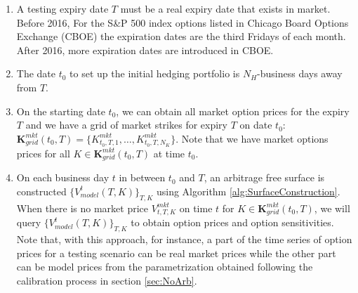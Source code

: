 \begin{enumerate}
	\item A testing expiry date $T$ must be a real expiry date that exists in market. Before 2016, For the S\&P 500 index options listed in Chicago Board Options Exchange (CBOE) the expiration dates are the third Fridays of each month. After 2016, more expiration dates are introduced in CBOE.
	\item The date $t_0$ to set up the initial hedging portfolio is  $N_H$-business days away from $T$.
	\item On the starting date $t_0$, we can obtain all market option prices for the expiry  $T$ and we have a grid of market strikes for expiry $T$ on date $t_0$:
	$\mathbf{K}^{mkt}_{grid}(t _0,T)=\{	K^{mkt}_{t_0,T,1},\dots,K^{mkt}_{t_0,T,N_K}\}$. Note that we have market options  prices for all $K \in \mathbf{K}^{mkt}_{grid}(t _0,T)$ at time $t_0$.
	\item On each business day $t$ in between $t _0$ and $T$, an arbitrage free surface is constructed $\{V^{t}_{model}(T,K)\}_{T,K}$ using Algorithm \ref{alg:SurfaceConstruction}. 
	When there is no  market price $V^{mkt}_{t,T,K}$ on time $t$ for $K \in \mathbf{K}^{mkt}_{grid}(t _0,T)$, we will query $\{V^{t}_{model}(T,K)\}_{T,K}$ to obtain  option prices and option sensitivities.  Note that, with this approach, for instance, a part  of the time series of option prices for a testing scenario can be real market prices while the other part can be model prices from the  parametrization  obtained following the calibration process in section \ref{sec:NoArb}.

\end{enumerate}
